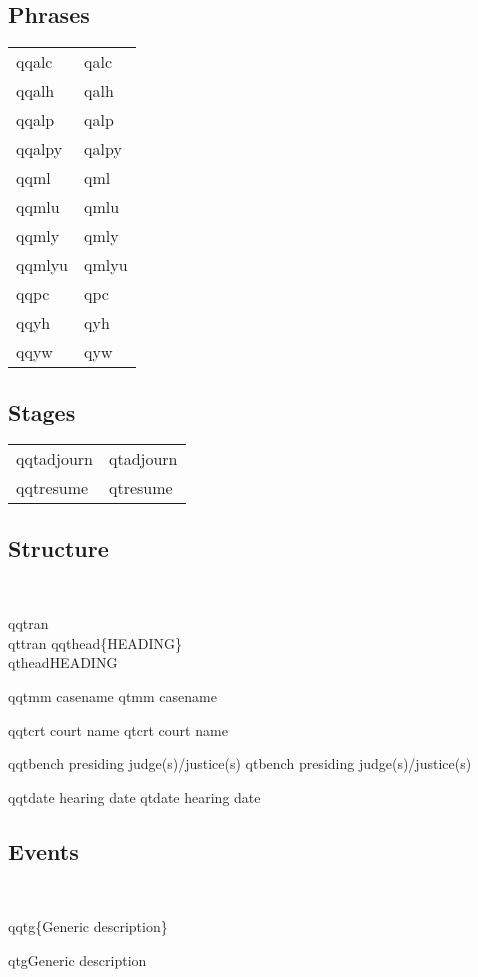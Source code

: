 \documentclass{article}
\begin{document}
\newpage
\subsection{Phrases}
\begin{tabular}{ll}
qqalc & qalc \\ 
qqalh & qalh \\ 
qqalp & qalp \\ 
qqalpy & qalpy \\ 
qqml & qml \\ 
qqmlu & qmlu \\
qqmly & qmly \\ 
qqmlyu & qmlyu \\ 
qqpc & qpc \\ 
qqyh & qyh \\ 
qqyw & qyw \\ 
\end{tabular}

\newpage
\subsection{Stages}
\begin{tabular}{ll}
qqtadjourn & qtadjourn \\
qqtresume & qtresume \\ 
\end{tabular}

\newpage
\subsection{Structure}
\ \par qqtran\\ qttran
qqthead\{HEADING\}\\ qthead{HEADING}

qqtmm casename
qtmm casename

qqtcrt court name
qtcrt court name

qqtbench presiding judge(s)/justice(s)
qtbench presiding judge(s)/justice(s)

qqtdate hearing date
qtdate hearing date


\newpage

\subsection{Events}
\ \par
qqtg\{Generic description\}

qtg{Generic description}
\end{document}
